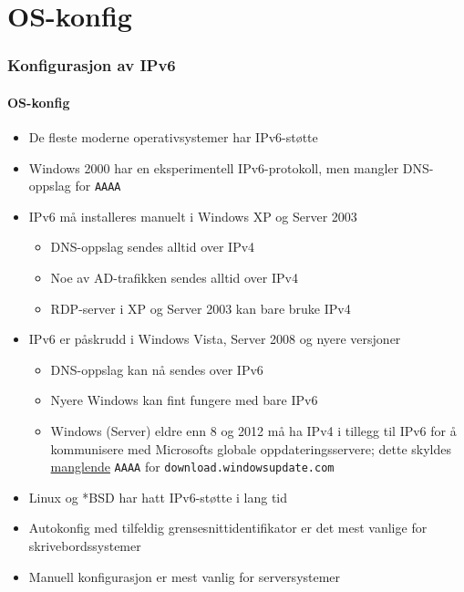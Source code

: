 \section{OS-konfig}
\begin{frame}
  \frametitle{Konfigurasjon av IPv6}
  \framesubtitle{OS-konfig}
  \begin{itemize}
  \item De fleste moderne operativsystemer har IPv6-støtte
  \item Windows 2000 har en eksperimentell IPv6-protokoll, men mangler
    DNS-oppslag for \texttt{AAAA}
  \item IPv6 må installeres manuelt i Windows XP og Server 2003
    \begin{itemize}
    \item DNS-oppslag sendes alltid over \alert{IPv4}
    \item Noe av AD-trafikken sendes alltid over \alert{IPv4}
    \item RDP-server i XP og Server 2003 kan bare bruke \alert{IPv4}
    \end{itemize}
  \item IPv6 er påskrudd i Windows Vista, Server 2008 og nyere versjoner
    \begin{itemize}
    \item DNS-oppslag kan nå sendes over IPv6
    \item Nyere Windows kan fint fungere med bare IPv6
    \item Windows (Server) eldre enn 8 og 2012 må ha \alert{IPv4} i
      tillegg til IPv6 for å kommunisere med Microsofts globale
      oppdateringsservere; dette skyldes
      \href{https://insinuator.net/2014/05/microsoft-windows-update-over-ipv6-or-not/}{manglende}
      \texttt{AAAA} for \texttt{download.windowsupdate.com}
    \end{itemize}
  \item Linux og *BSD har hatt IPv6-støtte i lang tid
  \item Autokonfig med tilfeldig grensesnittidentifikator er det mest
    vanlige for skrivebordssystemer
  \item Manuell konfigurasjon er mest vanlig for serversystemer
  \end{itemize}
\end{frame}

